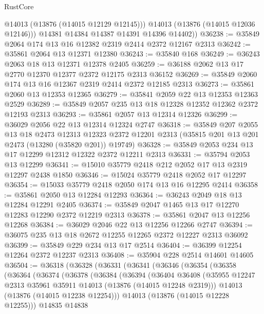 \begin{lexlean}{RustCore}
\begin{coremodule}
            @14013
            (@13876 (@14015 @12129 @12145)))
          @14013
          (@13876 (@14015 @12036 @12146)))
        @14381
        @14384
        @14387
        @14391
        @14396
        @14402))
@36238 := @35849 @2064 @174 @13 @16 @12382 @2319 @2414 @2372 @12167 @2313
@36242 := @35861 @2064 @13 @12371 @12380
@36243 := @35840 @168
@36249 := @36243 @2063 @18 @13 @12371 @12378 @2405
@36259 := @36188 @2062 @13 @17 @2770 @12370 @12377 @2372 @12175 @2313 @36152
@36269 := @35849 @2060 @174 @13 @16 @12367 @2319 @2414 @2372 @12185 @2313
@36273 := @35861 @2060 @13 @12353 @12365
@36279 := @35841 @2059 @22 @13 @12353 @12363 @2529
@36289 := @35849 @2057 @235 @13 @18 @12328 @12352 @12362 @2372 @12193 @2313
@36293 := @35861 @2057 @13 @12314 @12326
@36299 := @36029 @2056 @22 @13 @12314 @12324 @2747
@36318 := @35849
    @207
    @2055
    @13
    @18
    @2473
    @12313
    @12323
    @2372
    @12201
    @2313
    (@35815 @201 @13 @201 @2473 (@13280 (@35820 @201)) @19749)
@36328 := @35849 @2053 @234 @13 @17 @12299 @12312 @12322 @2372 @12211 @2313
@36331 := @35794 @2053 @13 @12299
@36341 := @15010 @35779 @2418 @212 @2052 @17 @13 @2319 @12297 @2438 @1850
@36346 := @15024 @35779 @2418 @2052 @17 @12297
@36354 := @15033 @35779 @2418 @2050 @174 @13 @16 @12295 @2414
@36358 := @35861 @2050 @13 @12284 @12293
@36364 := @36243 @2049 @18 @13 @12284 @12291 @2405
@36374 := @35849 @2047 @1465 @13 @17 @12270 @12283 @12290 @2372 @12219 @2313
@36378 := @35861 @2047 @13 @12256 @12268
@36384 := @36029 @2046 @22 @13 @12256 @12266 @2747
@36394 := @36075 @235 @13 @18 @2672 @12255 @12265 @2372 @12227 @2313 @36092
@36399 := @35849 @229 @234 @13 @17 @2514
@36404 := @36399 @12254 @12264 @2372 @12237 @2313
@36408 := @35904 @228 @2514 @14601 @14605
@36504 := @36318
    (@36328
      (@36331
        (@36341
          (@36346
            (@36354
              (@36358
                (@36364
                  (@36374
                    (@36378
                      (@36384
                        (@36394
                          (@36404
                            @36408
                            (@35955
                              @12247
                              @2313
                              @35961
                              @35911
                              @14013
                              (@13876 (@14015 @12248 @2319)))
                            @14013
                            (@13876 (@14015 @12238 @12254)))
                          @14013
                          (@13876 (@14015 @12228 @12255)))
                        @14835
                        @14838

\end{coremodule}
\end{lexlean}
